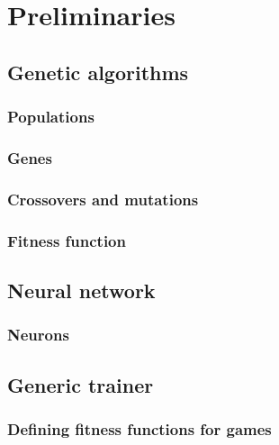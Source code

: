 \section{Preliminaries}
\label{sec:preliminaries}



\subsection{Genetic algorithms}


\subsubsection{Populations}


\subsubsection{Genes}


\subsubsection{Crossovers and mutations}


\subsubsection{Fitness function}


\subsection{Neural network}


\subsubsection{Neurons}


\subsection{Generic trainer}


\subsubsection{Defining fitness functions for games}


